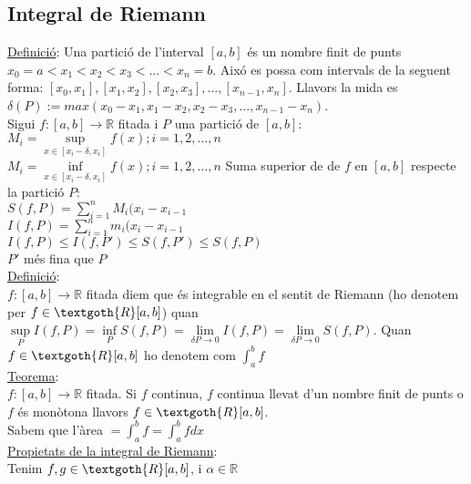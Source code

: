 \documentclass[../main.tex]{subfiles}
\begin{document}
    \subsection{Integral de Riemann}
    \underline{Definició}: Una partició de l'interval $[a, b]$ és un nombre finit de punts $x_0 = a < x_1 < x_2 < x_3 < \dots < x_n = b$. Aixó es possa com intervals de la seguent forma: $[x_0, x_1], [x_1, x_2], [x_2, x_3],\dots, [x_{n-1}, x_n]$. Llavors la mida es $\delta(P) := max(x_0 - x_1, x_1 - x_2, x_2 - x_3,\dots, x_{n-1} - x_n)$.\\
    Sigui $f: [a, b] \rightarrow \mathbb{R}$ fitada i $P$ una partició de $[a, b]$:\\
    $M_i = \sup\limits_{x \in [x_i-\delta, x_i]} f(x); i = 1, 2,\dots, n$\\
    $M_i = \inf\limits_{x \in [x_i-\delta, x_i]} f(x); i = 1, 2,\dots, n$
    Suma superior de de $f$ en $[a, b]$ respecte la partició $P$:\\
    $S(f, P) = \sum\limits_{i=1}^n M_i(x_i-x_{i-1}$\\
    $I(f, P) = \sum\limits_{i=1}^n m_i(x_i-x_{i-1}$\\
    $I(f, P) \leq I(f, P') \leq S(f, P') \leq S(f, P)$\\
    $P'$ més fina que $P$\\
    \underline{Definició}:\\
    $f: [a, b] \rightarrow \mathbb{R}$ fitada diem que és integrable en el sentit de Riemann (ho denotem per $f \in \textgoth{R}[a, b]$) quan $\sup\limits_P I(f, P) = \inf\limits_P S(f, P) = \lim\limits_{\delta{P} \rightarrow 0} I(f,P) = \lim\limits_{\delta{P} \rightarrow 0} S(f,P)$. Quan $f \in \textgoth{R}[a, b]$ ho denotem com $\int_a^b f$\\
    \underline{Teorema}:\\
    $f:[a, b] \rightarrow \mathbb{R}$ fitada. Si $f$ continua, $f$ continua llevat d'un nombre finit de punts o $f$ és monòtona llavors $f \in \textgoth{R}[a, b]$.\\
    Sabem que l'àrea $= \int_a^b f = \int_a^b f dx$\\
    \underline{Propietats de la integral de Riemann}:\\
    Tenim $f, g \in \textgoth{R}[a, b]$, i $\alpha \in \mathbb{R}$\\
\end{document}
